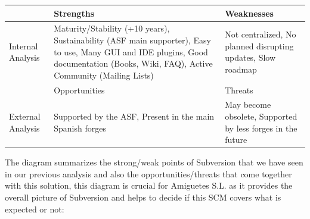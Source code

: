 \documentclass[a4paper,10pt]{article}
\begin{document}
\begin{center}
    \begin{tabular}{ | p{1.5cm} | p{5cm} | p{5cm} |}
    \hline
    & Strengths & Weaknesses \\ \hline
    Internal Analysis & 
    Maturity/Stability (+10 years),
    Sustainability (ASF main supporter),
    Easy to use,
    Many GUI and IDE plugins,
    Good documentation (Books, Wiki, FAQ),
    Active Community (Mailing Lists)
    & Not centralized,
    No planned disrupting updates, 
    Slow roadmap\\ \hline
    & Opportunities & Threats \\ \hline
    External Analysis 
    & Supported by the ASF,
    Present in the main Spanish forges
    & May become obsolete, 
    Supported by less forges in the future\\ \hline
    \end{tabular}
\end{center}

The diagram summarizes the strong/weak points of Subversion that we have seen in
our previous analysis and also the opportunities/threats that come together with
this solution, this diagram is crucial for Amiguetes S.L. as it provides the
overall picture of Subversion and helps to decide if this SCM covers what is
expected or not:
\end{document}
